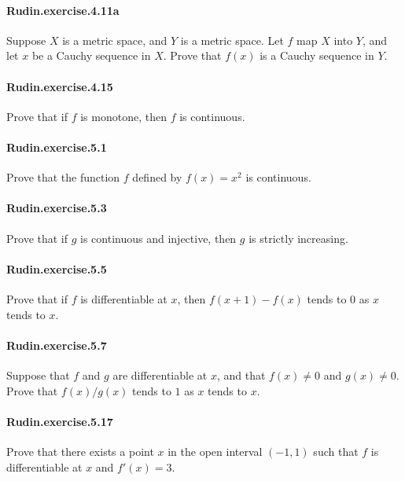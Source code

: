 \documentclass{article}
\begin{document}
\paragraph{Rudin.exercise.4.11a} Suppose $X$ is a metric space, and $Y$ is a metric space. Let $f$ map $X$ into $Y$, and let $x$ be a Cauchy sequence in $X$. Prove that $f(x)$ is a Cauchy sequence in $Y$.

\paragraph{Rudin.exercise.4.15} Prove that if $f$ is monotone, then $f$ is continuous.


\paragraph{Rudin.exercise.5.1} Prove that the function $f$ defined by $f(x) = x^2$ is continuous.

\paragraph{Rudin.exercise.5.3} Prove that if $g$ is continuous and injective, then $g$ is strictly increasing.

\paragraph{Rudin.exercise.5.5} Prove that if $f$ is differentiable at $x$, then $f(x+1)-f(x)$ tends to $0$ as $x$ tends to $x$.

\paragraph{Rudin.exercise.5.7} Suppose that $f$ and $g$ are differentiable at $x$, and that $f(x) \neq 0$ and $g(x) \neq 0$. Prove that $f(x) / g(x)$ tends to $1$ as $x$ tends to $x$.

\paragraph{Rudin.exercise.5.17} Prove that there exists a point $x$ in the open interval $(-1, 1)$ such that $f$ is differentiable at $x$ and $f'(x) = 3$.
\end{document}
